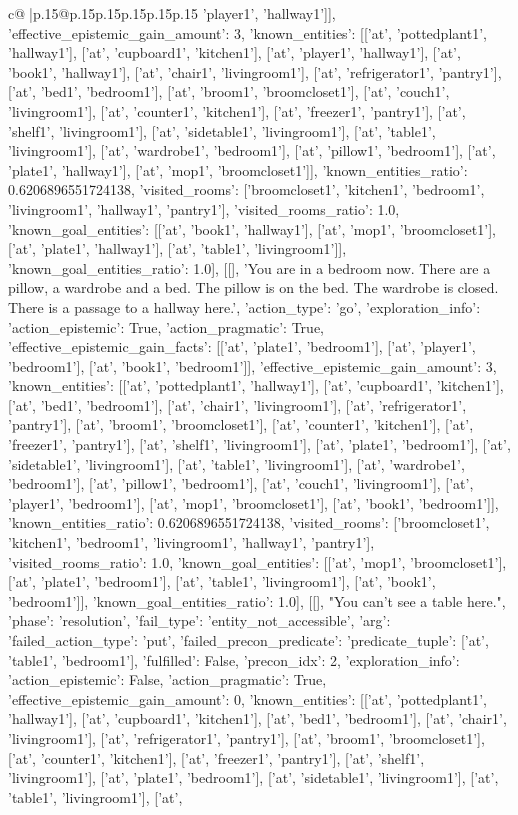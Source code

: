 \documentclass{article}
\begin{document}
{\begin{supertabular}{c@{$\;$}|p{.15\linewidth}@{}p{.15\linewidth}p{.15\linewidth}p{.15\linewidth}p{.15\linewidth}p{.15\linewidth}}
{{{'player1', 'hallway1']], 'effective_epistemic_gain_amount': 3, 'known_entities': [['at', 'pottedplant1', 'hallway1'], ['at', 'cupboard1', 'kitchen1'], ['at', 'player1', 'hallway1'], ['at', 'book1', 'hallway1'], ['at', 'chair1', 'livingroom1'], ['at', 'refrigerator1', 'pantry1'], ['at', 'bed1', 'bedroom1'], ['at', 'broom1', 'broomcloset1'], ['at', 'couch1', 'livingroom1'], ['at', 'counter1', 'kitchen1'], ['at', 'freezer1', 'pantry1'], ['at', 'shelf1', 'livingroom1'], ['at', 'sidetable1', 'livingroom1'], ['at', 'table1', 'livingroom1'], ['at', 'wardrobe1', 'bedroom1'], ['at', 'pillow1', 'bedroom1'], ['at', 'plate1', 'hallway1'], ['at', 'mop1', 'broomcloset1']], 'known_entities_ratio': 0.6206896551724138, 'visited_rooms': ['broomcloset1', 'kitchen1', 'bedroom1', 'livingroom1', 'hallway1', 'pantry1'], 'visited_rooms_ratio': 1.0, 'known_goal_entities': [['at', 'book1', 'hallway1'], ['at', 'mop1', 'broomcloset1'], ['at', 'plate1', 'hallway1'], ['at', 'table1', 'livingroom1']], 'known_goal_entities_ratio': 1.0}}], [[], 'You are in a bedroom now. There are a pillow, a wardrobe and a bed. The pillow is on the bed. The wardrobe is closed. There is a passage to a hallway here.', {'action_type': 'go', 'exploration_info': {'action_epistemic': True, 'action_pragmatic': True, 'effective_epistemic_gain_facts': [['at', 'plate1', 'bedroom1'], ['at', 'player1', 'bedroom1'], ['at', 'book1', 'bedroom1']], 'effective_epistemic_gain_amount': 3, 'known_entities': [['at', 'pottedplant1', 'hallway1'], ['at', 'cupboard1', 'kitchen1'], ['at', 'bed1', 'bedroom1'], ['at', 'chair1', 'livingroom1'], ['at', 'refrigerator1', 'pantry1'], ['at', 'broom1', 'broomcloset1'], ['at', 'counter1', 'kitchen1'], ['at', 'freezer1', 'pantry1'], ['at', 'shelf1', 'livingroom1'], ['at', 'plate1', 'bedroom1'], ['at', 'sidetable1', 'livingroom1'], ['at', 'table1', 'livingroom1'], ['at', 'wardrobe1', 'bedroom1'], ['at', 'pillow1', 'bedroom1'], ['at', 'couch1', 'livingroom1'], ['at', 'player1', 'bedroom1'], ['at', 'mop1', 'broomcloset1'], ['at', 'book1', 'bedroom1']], 'known_entities_ratio': 0.6206896551724138, 'visited_rooms': ['broomcloset1', 'kitchen1', 'bedroom1', 'livingroom1', 'hallway1', 'pantry1'], 'visited_rooms_ratio': 1.0, 'known_goal_entities': [['at', 'mop1', 'broomcloset1'], ['at', 'plate1', 'bedroom1'], ['at', 'table1', 'livingroom1'], ['at', 'book1', 'bedroom1']], 'known_goal_entities_ratio': 1.0}}], [[], "You can't see a table here.", {'phase': 'resolution', 'fail_type': 'entity_not_accessible', 'arg': {'failed_action_type': 'put', 'failed_precon_predicate': {'predicate_tuple': ['at', 'table1', 'bedroom1'], 'fulfilled': False, 'precon_idx': 2}}, 'exploration_info': {'action_epistemic': False, 'action_pragmatic': True, 'effective_epistemic_gain_amount': 0, 'known_entities': [['at', 'pottedplant1', 'hallway1'], ['at', 'cupboard1', 'kitchen1'], ['at', 'bed1', 'bedroom1'], ['at', 'chair1', 'livingroom1'], ['at', 'refrigerator1', 'pantry1'], ['at', 'broom1', 'broomcloset1'], ['at', 'counter1', 'kitchen1'], ['at', 'freezer1', 'pantry1'], ['at', 'shelf1', 'livingroom1'], ['at', 'plate1', 'bedroom1'], ['at', 'sidetable1', 'livingroom1'], ['at', 'table1', 'livingroom1'], ['at', }}}
\end{supertabular}}
\end{document}
